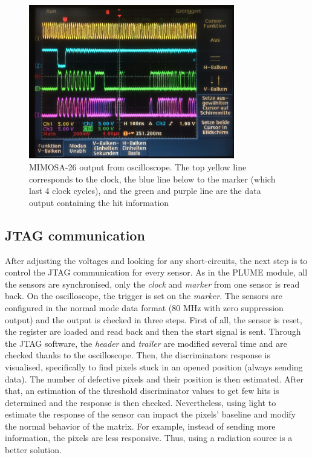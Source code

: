   \begin{figure}[h]
    \centering
    \includegraphics[width=0.8\textwidth]{Pictures/labTests/mi26_output}
    \caption{MIMOSA-26 output from oscilloscope. The top yellow line corresponds to the clock, the blue line below to the marker (which last 4 clock cycles), and the green and purple line are the data output containing the hit information}
    \label{fig:mi26Output}
  \end{figure}

  \subsection{JTAG communication}

  After adjusting the voltages and looking for any short-circuits, the next step is to control the JTAG communication for every sensor.
  As in the PLUME module, all the sensors are synchronised, only the \textit{clock} and \textit{marker} from one sensor is read back.
  On the oscilloscope, the trigger is set on the \textit{marker}.  
  The sensors are configured in the normal mode data format (80 MHz with zero suppression output) and the output is checked in three steps.
  First of all, the sensor is reset, the register are loaded and read back and then the start signal is sent. 
  Through the JTAG software, the \textit{header} and \textit{trailer} are modified several time and are checked thanks to the oscilloscope.
  Then, the discriminators response is visualised, specifically to find pixels stuck in an opened position (always sending data).
  The number of defective pixels and their position is then estimated.
  After that, an estimation of the threshold discriminator values to get few hits is determined and the response is then checked.
  Nevertheless, using light to estimate the response of the sensor can impact the pixels' baseline and modify the normal behavior of the matrix.
  For example, instead of sending more information, the pixels are less responsive.
  Thus, using a radiation source is a better solution.

